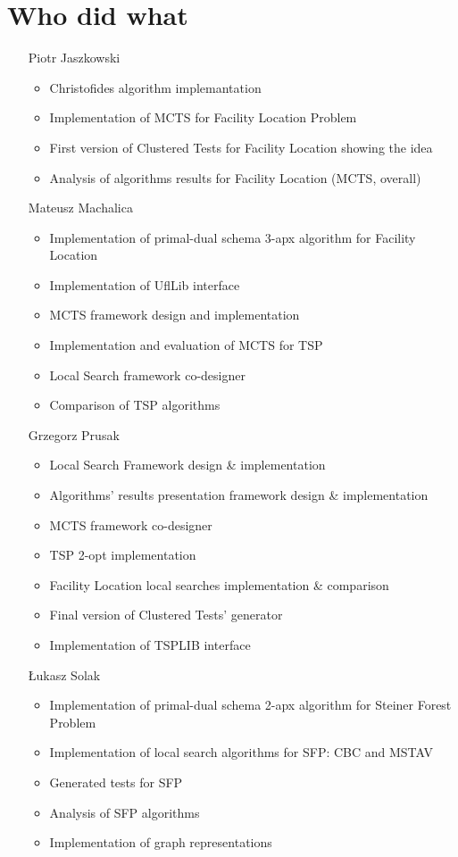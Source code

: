 \documentclass[licencjacka]{pracamgr}
\begin{document}
\chapter*{Who did what}
\begin{itemize}
	\item[Piotr Jaszkowski]
		\begin{itemize}
			\item Christofides algorithm implemantation
			\item Implementation of MCTS for Facility Location Problem
			\item First version of Clustered Tests for Facility Location showing the idea
			\item Analysis of algorithms results for Facility Location
				(MCTS, overall)
		\end{itemize}
	\item[Mateusz Machalica]
		\begin{itemize}
			\item Implementation of primal-dual schema 3-apx algorithm for Facility Location
      \item Implementation of UflLib interface
      \item MCTS framework design and implementation
      \item Implementation and evaluation of MCTS for TSP
      \item Local Search framework co-designer
      \item Comparison of TSP algorithms
		\end{itemize}
	\item[Grzegorz Prusak]
	  \begin{itemize}
        \item Local Search Framework design \& implementation
        \item Algorithms' results presentation framework design \& implementation
        \item MCTS framework co-designer
        \item TSP 2-opt implementation
        \item Facility Location local searches implementation \& comparison
		\item Final version of Clustered Tests' generator
        \item Implementation of TSPLIB interface
	  \end{itemize}
	\item[Łukasz Solak]
		\begin{itemize}
			\item Implementation of primal-dual schema 2-apx algorithm for Steiner Forest Problem
      \item Implementation of local search algorithms for SFP: CBC and MSTAV
      \item Generated tests for SFP
      \item Analysis of SFP algorithms
      \item Implementation of graph representations
		\end{itemize}
\end{itemize}
\end{document}
